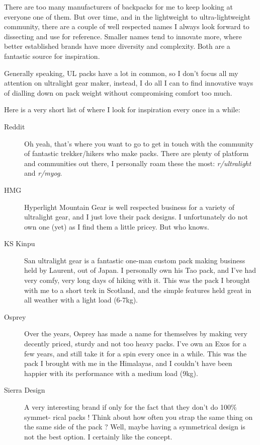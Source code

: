 There are too many manufacturers of backpacks for me to keep looking at everyone one of them. But over time, and in the lightweight to ultra-lightweight community, there are a couple of well respected names I always look forward to dissecting and use for reference. Smaller names tend to innovate more, where better established brands have more diversity and complexity. Both are a fantastic source for inspiration.

Generally speaking, UL packs have a lot in common, so I don’t focus all my attention on ultralight gear maker, instead, I do all I can to find innovative ways of dialling down on pack weight without compromising comfort too much.

Here is a very short list of where I look for inspiration every once in a while:

\begin{description}

  \item [Reddit] Oh yeah, that’s where you want to go to get in touch with the community of fantastic trekker/hikers who make packs. There are plenty of platform and communities out there, I personally roam these the most: \textit{r/ultralight} and \textit{r/myog}.

  \item [HMG] Hyperlight Mountain Gear is well respected business for a variety of ultralight gear, and I just love their pack designs. I unfortunately do not own one (yet) as I find them a little pricey. But who knows.

  \item [KS Kinpu] San ultralight gear is a fantastic one-man custom pack making business held by Laurent, out of Japan. I personally own his Tao pack, and I’ve had very comfy, very long days of hiking with it. This was the pack I brought with me to a short trek in Scotland, and the simple features held great in all weather with a light load (6-7kg).

  \item [Osprey] Over the years, Osprey has made a name for themselves by making very decently priced, sturdy and not too heavy packs. I’ve own an Exos for a few years, and still take it for a spin every once in a while. This was the pack I brought with me in the Himalayas, and I couldn’t have been happier with its performance with a medium load (9kg).
  \item [Sierra Design] A very interesting brand if only for the fact that they don’t do 100\% symmet- rical packs ! Think about how often you strap the same thing on the same side of the pack ? Well, maybe having a symmetrical design is not the best option. I certainly like the concept.


\end{description}
